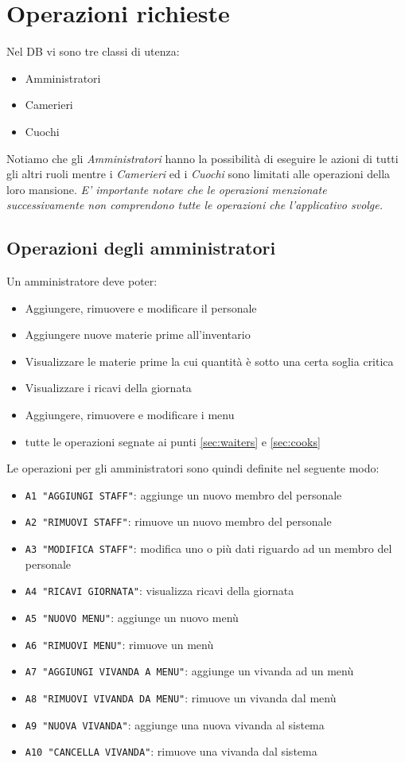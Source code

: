 \documentclass[a4paper,12pt]{report}
\begin{document}
\section{Operazioni richieste}\label{sec:ops}
Nel DB vi sono tre classi di utenza:
\begin{itemize}
    \item Amministratori
    \item Camerieri
    \item Cuochi
\end{itemize}
\par Notiamo che gli \textit{Amministratori} hanno la possibilità di eseguire le azioni di tutti gli altri ruoli mentre i \textit{Camerieri} ed i \textit{Cuochi} sono limitati alle operazioni della loro mansione.
%
\textit{E' importante notare che le operazioni menzionate successivamente non comprendono tutte le operazioni che l'applicativo svolge.}
%
\subsection{Operazioni degli amministratori}
Un amministratore deve poter:
%
\begin{itemize}
    \item Aggiungere, rimuovere e modificare il personale
    \item Aggiungere nuove materie prime all’inventario
    \item Visualizzare le materie prime la cui quantità è sotto una certa soglia critica
    \item Visualizzare i ricavi della giornata
    \item Aggiungere, rimuovere e modificare i menu
    \item {tutte le operazioni segnate ai punti \ref{sec:waiters} e \ref{sec:cooks}}
\end{itemize}
%
Le operazioni per gli amministratori sono quindi definite nel seguente modo: 
%
\begin{itemize}
    \item \texttt{A1 "AGGIUNGI STAFF"}: aggiunge un nuovo membro del personale
    \item \texttt{A2 "RIMUOVI STAFF"}: rimuove un nuovo membro del personale 
    \item \texttt{A3 "MODIFICA STAFF"}: modifica uno o più dati riguardo ad un membro del personale
    \item \texttt{A4 "RICAVI GIORNATA"}: visualizza ricavi della giornata 
    \item \texttt{A5 "NUOVO MENU"}: aggiunge un nuovo menù 
    \item \texttt{A6 "RIMUOVI MENU"}: rimuove un menù
    \item \texttt{A7 "AGGIUNGI VIVANDA A MENU"}: aggiunge un vivanda ad un menù
    \item \texttt{A8 "RIMUOVI VIVANDA DA MENU"}: rimuove un vivanda dal menù
    \item \texttt{A9 "NUOVA VIVANDA"}: aggiunge una nuova vivanda al sistema
    \item \texttt{A10 "CANCELLA VIVANDA"}: rimuove una vivanda dal sistema
\end{itemize}
%
\end{document}
